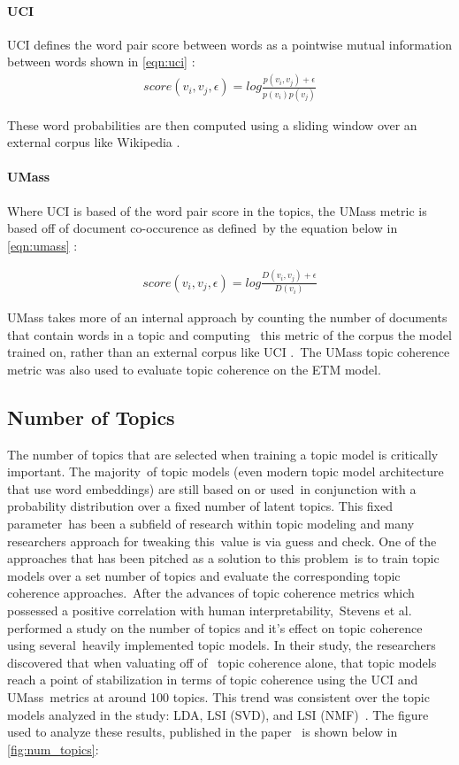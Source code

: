 \documentclass[letterpaper,12pt]{article}
\begin{document}
\paragraph{UCI}
UCI defines the word pair score between words as a pointwise mutual information between words shown in \ref{eqn:uci} \cite{stevens2012exploring}:
\begin{eqnarray}
	\label{eqn:uci}
	score(v_i,v_j,\epsilon) = log \frac{p(v_i,v_j) + \epsilon}{p(v_i)p(v_j)}
\end{eqnarray}

These word probabilities are then computed using a sliding window over an external corpus like Wikipedia \cite{stevens2012exploring}.

\paragraph{UMass}
Where UCI is based of the word pair score in the topics, the UMass metric is based off of document co-occurence as defined\
by the equation below in \ref{eqn:umass} \cite{mimno2011optimizing}:

\begin{eqnarray}
	\label{eqn:umass}
	score(v_i,v_j,\epsilon) = log \frac{D(v_i,v_j) + \epsilon}{D(v_i)}
\end{eqnarray}

UMass takes more of an internal approach by counting the number of documents that contain words in a topic and computing \
this metric of the corpus the model trained on, rather than an external corpus like UCI \cite{stevens2012exploring}.\
The UMass topic coherence metric was also used to evaluate topic coherence on the ETM model.

\subsection{Number of Topics}
The number of topics that are selected when training a topic model is critically important. The majority\
of topic models (even modern topic model architecture that use word embeddings) are still based on or used\
in conjunction with a probability distribution over a fixed number of latent topics. This fixed parameter\
has been a subfield of research within topic modeling and many researchers approach for tweaking this\
value is via guess and check. One of the approaches that has been pitched as a solution to this problem\
is to train topic models over a set number of topics and evaluate the corresponding topic coherence approaches.\
After the advances of topic coherence metrics which possessed a positive correlation with human interpretability,\
Stevens et al. performed a study on the number of topics and it's effect on topic coherence using several\
heavily implemented topic models. In their study, the researchers discovered that when valuating off of \
topic coherence alone, that topic models reach a point of stabilization in terms of topic coherence using the UCI and UMass\
metrics at around 100 topics. This trend was consistent over the topic models analyzed in the study: LDA, LSI (SVD), and LSI (NMF)\
\cite{stevens2012exploring}. The figure used to analyze these results, published in the paper \
is shown below in \ref{fig:num_topics}:
\end{document}
